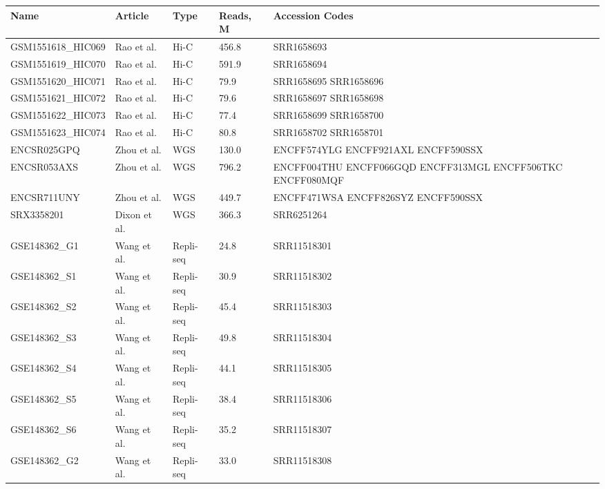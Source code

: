 \documentclass[a4paper,12pt]{article}
\begin{document}
\label{appendix:accession}

\bgroup
\def\arraystretch{1.5}
\begin{tabular}{| l | l | l | l | p{3cm} |}
\hline
\textbf{Name} & \textbf{Article} & \textbf{Type} & \textbf{Reads, M} & \textbf{Accession Codes} \\
\hline
GSM1551618\_HIC069 & Rao et al.\cite{rao} & Hi-C & 456.8 & SRR1658693 \\
\hline
GSM1551619\_HIC070 & Rao et al.\cite{rao} & Hi-C & 591.9 & SRR1658694 \\
\hline
GSM1551620\_HIC071 & Rao et al.\cite{rao} & Hi-C & 79.9 & SRR1658695 SRR1658696 \\
\hline
GSM1551621\_HIC072 & Rao et al.\cite{rao} & Hi-C & 79.6 & SRR1658697 SRR1658698 \\
\hline
GSM1551622\_HIC073 & Rao et al.\cite{rao} & Hi-C & 77.4 & SRR1658699 SRR1658700 \\
\hline
GSM1551623\_HIC074 & Rao et al.\cite{rao} & Hi-C & 80.8 & SRR1658702 SRR1658701 \\
\hline
ENCSR025GPQ & Zhou et al.\cite{zhou} & WGS & 130.0 & ENCFF574YLG ENCFF921AXL ENCFF590SSX \\
\hline
ENCSR053AXS & Zhou et al.\cite{zhou} & WGS & 796.2 & ENCFF004THU ENCFF066GQD ENCFF313MGL ENCFF506TKC ENCFF080MQF \\
\hline
ENCSR711UNY & Zhou et al.\cite{zhou} & WGS & 449.7 & ENCFF471WSA ENCFF826SYZ ENCFF590SSX \\
\hline
SRX3358201 & Dixon et al.\cite{dixon} & WGS & 366.3 & SRR6251264 \\
\hline
GSE148362\_G1 & Wang et al.\cite{wang} & Repli-seq & 24.8 & SRR11518301 \\
\hline
GSE148362\_S1 & Wang et al.\cite{wang} & Repli-seq & 30.9 & SRR11518302 \\
\hline
GSE148362\_S2 & Wang et al.\cite{wang} & Repli-seq & 45.4 & SRR11518303 \\
\hline
GSE148362\_S3 & Wang et al.\cite{wang} & Repli-seq & 49.8 & SRR11518304 \\
\hline
GSE148362\_S4 & Wang et al.\cite{wang} & Repli-seq & 44.1 & SRR11518305 \\
\hline
GSE148362\_S5 & Wang et al.\cite{wang} & Repli-seq & 38.4 & SRR11518306 \\
\hline
GSE148362\_S6 & Wang et al.\cite{wang} & Repli-seq & 35.2 & SRR11518307 \\
\hline
GSE148362\_G2 & Wang et al.\cite{wang} & Repli-seq & 33.0 & SRR11518308 \\
\hline
\end{tabular}
\end{document}
